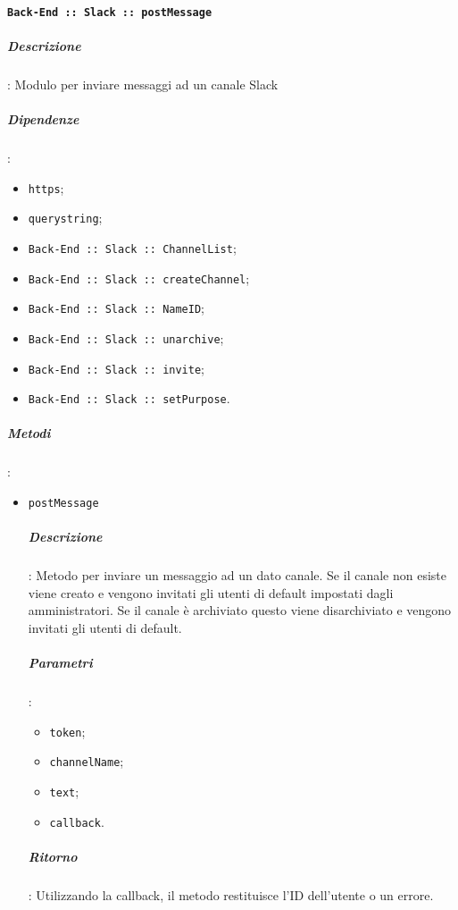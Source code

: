\documentclass[../DefinizioneDiProdotto_v3.0.0.tex]{subfiles}
\begin{document}
\paragraph{\texttt{Back-End :: Slack :: postMessage}}
\subparagraph{Descrizione}: Modulo per inviare messaggi ad un canale Slack
\subparagraph{Dipendenze}:
\begin{itemize}
	\item \texttt{https};
	\item \texttt{querystring};
	\item \texttt{Back-End :: Slack :: ChannelList};
	\item \texttt{Back-End :: Slack :: createChannel};
	\item \texttt{Back-End :: Slack :: NameID};
	\item \texttt{Back-End :: Slack :: unarchive};
	\item \texttt{Back-End :: Slack :: invite};
	\item \texttt{Back-End :: Slack :: setPurpose}.
\end{itemize}
\subparagraph{Metodi}:
\begin{itemize}
	\item \texttt{postMessage}
	      \subparagraph{Descrizione}: Metodo per inviare un messaggio ad un dato canale. Se il canale non esiste viene creato e vengono invitati gli utenti di default impostati dagli amministratori. Se il canale è archiviato questo viene disarchiviato e vengono invitati gli utenti di default.
	      \subparagraph{Parametri}:
	      \begin{itemize}
	      	\item \texttt{token};
	      	\item \texttt{channelName};
	      	\item \texttt{text};
	      	\item \texttt{callback}.
	      \end{itemize}
	      \subparagraph{Ritorno}: Utilizzando la callback, il metodo restituisce l'ID dell'utente o un errore.
\end{itemize}
\end{document}
